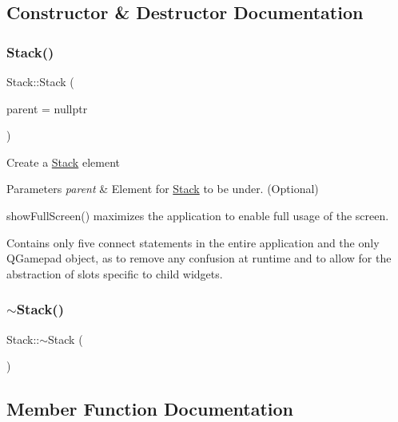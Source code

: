 \subsection{Constructor \& Destructor Documentation}
\mbox{\label{classStack_aa9d4cb23f0d4ade8db1df8624629cc14}} 
\subsubsection{\texorpdfstring{Stack()}{Stack()}}
{\footnotesize\ttfamily Stack\+::\+Stack (\begin{DoxyParamCaption}\item[{Q\+Widget $\ast$}]{parent = {\ttfamily nullptr} }\end{DoxyParamCaption})\hspace{0.3cm}{\ttfamily [explicit]}}

Create a \mbox{\hyperlink{classStack}{Stack}} element 
\begin{DoxyParams}{Parameters}
{\em parent} & Element for \mbox{\hyperlink{classStack}{Stack}} to be under. (Optional)\\
\hline
\end{DoxyParams}
show\+Full\+Screen() maximizes the application to enable full usage of the screen.

Contains only five connect statements in the entire application and the only Q\+Gamepad object, as to remove any confusion at runtime and to allow for the abstraction of slots specific to child widgets. \mbox{\label{classStack_a40bd5dff912f0e5290777c4b46d17809}} 
\subsubsection{\texorpdfstring{$\sim$Stack()}{~Stack()}}
{\footnotesize\ttfamily Stack\+::$\sim$\+Stack (\begin{DoxyParamCaption}{ }\end{DoxyParamCaption})}



\subsection{Member Function Documentation}
\mbox{\label{classStack_a2f8a3dee32407abe994b7332282d03de}} 

